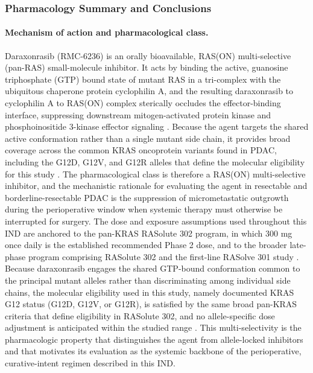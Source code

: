
\subsubsection{Pharmacology Summary and Conclusions}

\paragraph{Mechanism of action and pharmacological class.}
Daraxonrasib (RMC-6236) is an orally bioavailable, RAS(ON) multi-selective
(pan-RAS) small-molecule inhibitor. It acts by binding the active, guanosine
triphosphate (GTP) bound state of mutant RAS in a tri-complex with the
ubiquitous chaperone protein cyclophilin A, and the resulting daraxonrasib to
cyclophilin A to RAS(ON) complex sterically occludes the effector-binding
interface, suppressing downstream mitogen-activated protein kinase and
phosphoinositide 3-kinase effector signaling \cite{daraxwhipple}. Because the
agent targets the shared active conformation rather than a single mutant side
chain, it provides broad coverage across the common KRAS oncoprotein variants
found in PDAC, including the G12D, G12V, and G12R alleles that define the
molecular eligibility for this study \cite{daraxwhipple,onpremwhippl}. The
pharmacological class is therefore a RAS(ON) multi-selective inhibitor, and the
mechanistic rationale for evaluating the agent in resectable and
borderline-resectable PDAC is the suppression of micrometastatic outgrowth
during the perioperative window when systemic therapy must otherwise be
interrupted for surgery. The dose and exposure assumptions used throughout this
IND are anchored to the pan-KRAS RASolute 302 program, in which 300 mg once
daily is the established recommended Phase 2 dose, and to the broader late-phase
program comprising RASolute 302 and the first-line RASolve 301 study
\cite{daraxwhipple}. Because daraxonrasib engages the shared GTP-bound
conformation common to the principal mutant alleles rather than discriminating
among individual side chains, the molecular eligibility used in this study, namely
documented KRAS G12 status (G12D, G12V, or G12R), is satisfied by the same broad
pan-KRAS criteria that define eligibility in RASolute 302, and no allele-specific
dose adjustment is anticipated within the studied range
\cite{daraxwhipple,onpremwhippl}. This multi-selectivity is the pharmacologic
property that distinguishes the agent from allele-locked inhibitors and that
motivates its evaluation as the systemic backbone of the perioperative,
curative-intent regimen described in this IND.

